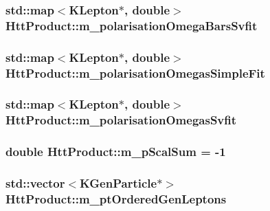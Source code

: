 \label{classHttProduct_a2c33c1585a230077b24bc0050ccec598}
\hypertarget{classHttProduct_a8eda87274c5559af86ec2fac290f8aad}{
\subsubsection[{m\_\-polarisationOmegaBarsSvfit}]{\setlength{\rightskip}{0pt plus 5cm}std::map$<$KLepton$\ast$, double$>$ {\bf HttProduct::m\_\-polarisationOmegaBarsSvfit}}}
\label{classHttProduct_a8eda87274c5559af86ec2fac290f8aad}
\hypertarget{classHttProduct_a5d985659a837ce0cd45fd247c8d28827}{
\subsubsection[{m\_\-polarisationOmegasSimpleFit}]{\setlength{\rightskip}{0pt plus 5cm}std::map$<$KLepton$\ast$, double$>$ {\bf HttProduct::m\_\-polarisationOmegasSimpleFit}}}
\label{classHttProduct_a5d985659a837ce0cd45fd247c8d28827}
\hypertarget{classHttProduct_ad23306a6f236a70a45aed2d285e32750}{
\subsubsection[{m\_\-polarisationOmegasSvfit}]{\setlength{\rightskip}{0pt plus 5cm}std::map$<$KLepton$\ast$, double$>$ {\bf HttProduct::m\_\-polarisationOmegasSvfit}}}
\label{classHttProduct_ad23306a6f236a70a45aed2d285e32750}
\hypertarget{classHttProduct_a45abb293846b6666a1f790e5958b719d}{
\subsubsection[{m\_\-pScalSum}]{\setlength{\rightskip}{0pt plus 5cm}double {\bf HttProduct::m\_\-pScalSum} = -\/1}}
\label{classHttProduct_a45abb293846b6666a1f790e5958b719d}
\hypertarget{classHttProduct_aeed3fd71b9606c0d2a4d8da8500e510a}{
\subsubsection[{m\_\-ptOrderedGenLeptons}]{\setlength{\rightskip}{0pt plus 5cm}std::vector$<$KGenParticle$\ast$$>$ {\bf HttProduct::m\_\-ptOrderedGenLeptons}}}
